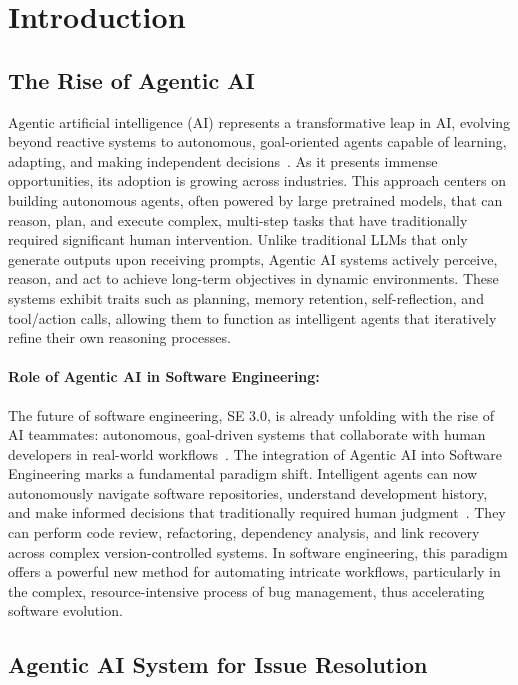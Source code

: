 \section{Introduction}

\subsection{The Rise of Agentic AI}

Agentic artificial intelligence (AI) represents a transformative leap in AI, evolving beyond reactive systems to autonomous, goal-oriented agents capable of learning, adapting, and making independent decisions~\cite{agentic_ai1}. As it presents immense opportunities, its adoption is growing across industries.  This approach centers on building autonomous agents, often powered by large pretrained models, that can reason, plan, and execute complex, multi-step tasks that have traditionally required significant human intervention. Unlike traditional LLMs that only generate outputs upon receiving prompts, Agentic AI systems actively perceive, reason, and act to achieve long-term objectives in dynamic environments. These systems exhibit traits such as planning, memory retention, self-reflection, and tool/action calls, allowing them to function as intelligent agents that iteratively refine their own reasoning processes.

\paragraph{Role of Agentic AI in Software Engineering:}

The future of software engineering, SE 3.0, is already unfolding with the rise of AI teammates: autonomous, goal-driven systems that collaborate with human developers in real-world workflows~\cite{arxiv250715003}. The integration of Agentic AI into Software Engineering marks a fundamental paradigm shift. Intelligent agents can now autonomously navigate software repositories, understand development history, and make informed decisions that traditionally required human judgment~\cite{traceability,btlink}. They can perform code review, refactoring, dependency analysis, and link recovery across complex version-controlled systems. In software engineering, this paradigm offers a powerful new method for automating intricate workflows, particularly in the complex, resource-intensive process of bug management, thus accelerating software evolution.

\subsection{Agentic AI System for Issue Resolution}

